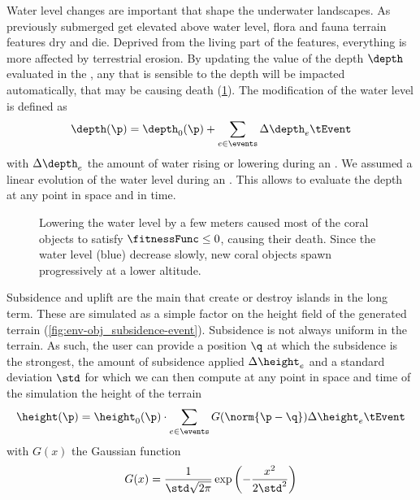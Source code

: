 Water level changes are important  that shape the underwater landscapes. As previously submerged  get elevated above water level, flora and fauna terrain features dry and die. Deprived from the living part of the features, everything is more affected by terrestrial erosion. By updating the value of the depth $\depth$ evaluated in the , any  that is sensible to the depth will be impacted automatically, that may be causing death (\cref{fig:env-obj_water-event}). The modification of the water level is defined as 
\begin{align*}
    \depth(\p) = \depth_0(\p) + \sum_{e \in \events} \Delta \depth_e \tEvent
\end{align*}
with $\Delta \depth_e$ the amount of water rising or lowering during an . We assumed a linear evolution of the water level during an . This allows to evaluate the depth at any point in space and in time.

\begin{figure}
    \caption{Lowering the water level by a few meters caused most of the coral objects to satisfy $\fitnessFunc \leq 0$, causing their death. Since the water level (blue) decrease slowly, new coral objects spawn progressively at a lower altitude.}
    \label{fig:env-obj_water-event}
\end{figure}

Subsidence and uplift are the main  that create or destroy islands in the long term. These  are simulated as a simple factor on the height field of the generated terrain (\cref{fig:env-obj_subsidence-event}). Subsidence is not always uniform in the terrain. As such, the user can provide a position $\q$ at which the subsidence is the strongest, the amount of subsidence applied $\Delta \height_e$ and a standard deviation $\std$ for which we can then compute at any point in space and time of the simulation the height of the terrain
\begin{align*}
    \height(\p) = \height_0(\p) \cdot \sum_{e \in \events}{G(\norm{\p - \q})} \Delta \height_e \tEvent 
\end{align*}
with $G(x)$ the Gaussian function
\begin{align*}
    G(x) = \frac{1}{\std \sqrt{2\pi}} \exp \left(-\frac {x^{2}}{2 \std ^{2}}\right)
\end{align*}

